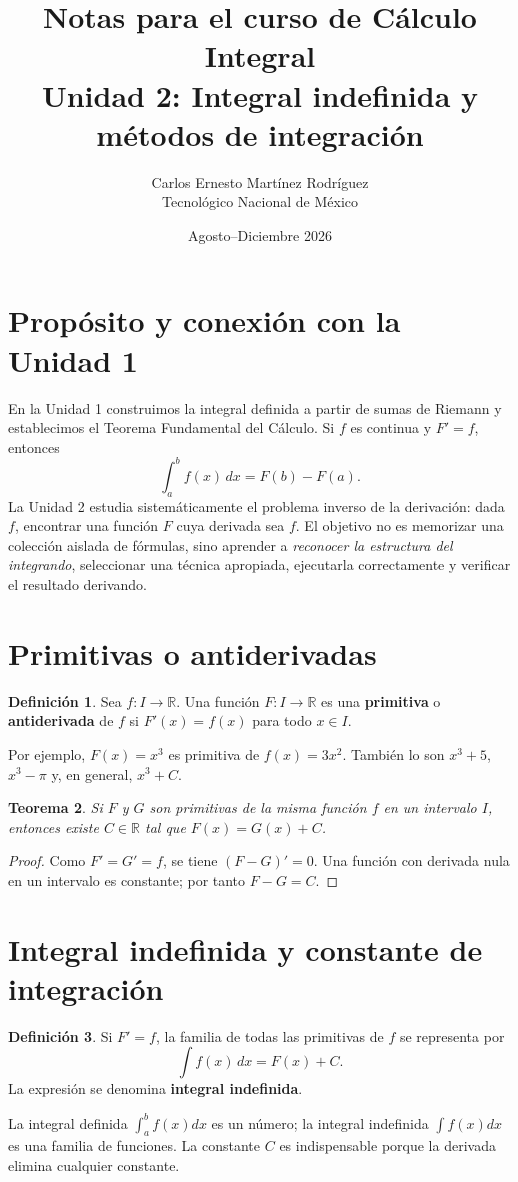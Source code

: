\documentclass[12pt]{article}
\title{\textbf{Notas para el curso de Cálculo Integral}\\[0.3cm]\Large Unidad 2: Integral indefinida y métodos de integración}
\author{Carlos Ernesto Martínez Rodríguez\\Tecnológico Nacional de México}
\date{Agosto--Diciembre 2026}
\newtheorem{teorema}{Teorema}[section]\newtheorem{proposicion}[teorema]{Proposición}\newtheorem{corolario}[teorema]{Corolario}
\theoremstyle{definition}\newtheorem{definicion}[teorema]{Definición}\newtheorem{ejemplo}[teorema]{Ejemplo}\newtheorem{ejercicio}[teorema]{Ejercicio}
\theoremstyle{remark}\newtheorem*{observacion}{Observación}\newtheorem*{advertencia}{Advertencia}\newtheorem*{estrategia}{Estrategia}
\newcommand{\R}{\mathbb{R}}\newcommand{\dd}{\,dx}\newcommand{\du}{\,du}\newcommand{\dt}{\,dt}
\begin{document}
\maketitle\tableofcontents\newpage

\section{Propósito y conexión con la Unidad 1}
En la Unidad 1 construimos la integral definida a partir de sumas de Riemann y establecimos el Teorema Fundamental del Cálculo. Si $f$ es continua y $F'=f$, entonces
\[\int_a^b f(x)\,dx=F(b)-F(a).\]
La Unidad 2 estudia sistemáticamente el problema inverso de la derivación: dada $f$, encontrar una función $F$ cuya derivada sea $f$. El objetivo no es memorizar una colección aislada de fórmulas, sino aprender a \emph{reconocer la estructura del integrando}, seleccionar una técnica apropiada, ejecutarla correctamente y verificar el resultado derivando.

\section{Primitivas o antiderivadas}
\begin{definicion}Sea $f:I\to\R$. Una función $F:I\to\R$ es una \textbf{primitiva} o \textbf{antiderivada} de $f$ si $F'(x)=f(x)$ para todo $x\in I$.\end{definicion}
Por ejemplo, $F(x)=x^3$ es primitiva de $f(x)=3x^2$. También lo son $x^3+5$, $x^3-\pi$ y, en general, $x^3+C$.
\begin{teorema}Si $F$ y $G$ son primitivas de la misma función $f$ en un intervalo $I$, entonces existe $C\in\R$ tal que $F(x)=G(x)+C$.\end{teorema}
\begin{proof}Como $F'=G'=f$, se tiene $(F-G)'=0$. Una función con derivada nula en un intervalo es constante; por tanto $F-G=C$.\end{proof}

\section{Integral indefinida y constante de integración}
\begin{definicion}Si $F'=f$, la familia de todas las primitivas de $f$ se representa por
\[\boxed{\int f(x)\,dx=F(x)+C}.\]
La expresión se denomina \textbf{integral indefinida}.\end{definicion}
La integral definida $\int_a^b f(x)dx$ es un número; la integral indefinida $\int f(x)dx$ es una familia de funciones. La constante $C$ es indispensable porque la derivada elimina cualquier constante.
\end{document}
